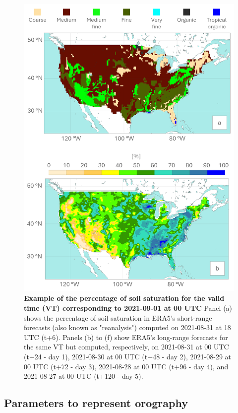\begin{figure}[htbp]
\centering
\includegraphics[width=\textwidth]{perc_soil_saturation.png}
\caption{\textbf{Example of the percentage of soil saturation for the valid time (VT) corresponding to 2021-09-01 at 00 UTC} Panel (a) shows the percentage of soil saturation in ERA5's short-range forecasts (also known as "reanalysis") computed on 2021-08-31 at 18 UTC (t+6). Panels (b) to (f) show ERA5's long-range forecasts for the same VT but computed, respectively, on 2021-08-31 at 00 UTC (t+24 - day 1), 2021-08-30 at 00 UTC (t+48 - day 2), 2021-08-29 at 00 UTC (t+72  - day 3), 2021-08-28 at 00 UTC (t+96 - day 4), and 2021-08-27 at 00 UTC (t+120 - day 5).}
\label{fig:perc_soil_saturation}
\end{figure}


\subsection{Parameters to represent orography}

